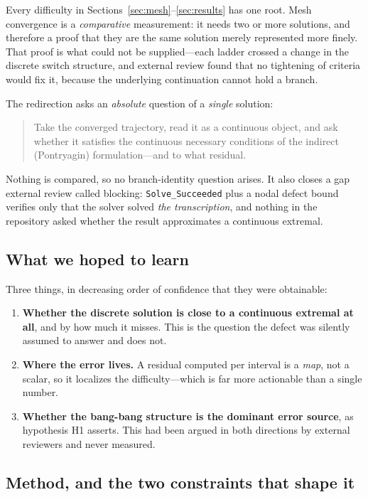 \documentclass[11pt]{article}
\begin{document}
Every difficulty in Sections~\ref{sec:mesh}--\ref{sec:results} has one root.
Mesh convergence is a \emph{comparative} measurement: it needs two or more
solutions, and therefore a proof that they are the same solution merely
represented more finely. That proof is what could not be supplied---each ladder
crossed a change in the discrete switch structure, and external review found
that no tightening of criteria would fix it, because the underlying
continuation cannot hold a branch.

The redirection asks an \emph{absolute} question of a \emph{single} solution:

\begin{quote}
Take the converged trajectory, read it as a continuous object, and ask whether
it satisfies the continuous necessary conditions of the indirect (Pontryagin)
formulation---and to what residual.
\end{quote}

Nothing is compared, so no branch-identity question arises. It also closes a
gap external review called blocking: \texttt{Solve\_Succeeded} plus a nodal
defect bound verifies only that the solver solved \emph{the transcription}, and
nothing in the repository asked whether the result approximates a continuous
extremal.

\subsection{What we hoped to learn}

Three things, in decreasing order of confidence that they were obtainable:

\begin{enumerate}
  \item \textbf{Whether the discrete solution is close to a continuous
  extremal at all}, and by how much it misses. This is the question the defect
  was silently assumed to answer and does not.
  \item \textbf{Where the error lives.} A residual computed per interval is a
  \emph{map}, not a scalar, so it localizes the difficulty---which is far more
  actionable than a single number.
  \item \textbf{Whether the bang-bang structure is the dominant error source},
  as hypothesis H1 asserts. This had been argued in both directions by external
  reviewers and never measured.
\end{enumerate}

\subsection{Method, and the two constraints that shape it}
\end{document}
